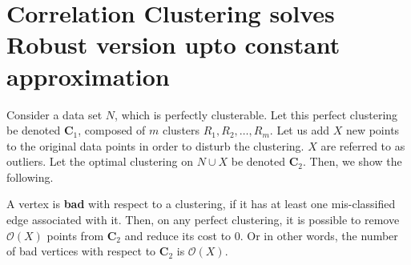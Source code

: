 \section{Correlation Clustering solves Robust version upto constant approximation}

Consider a data set $N$, which is perfectly clusterable. Let this perfect clustering be denoted $\mathbf{C}_1$, composed of $m$ clusters $R_1, R_2, \dots, R_m$. Let us add $X$ new points to the original data points in order to disturb the clustering. $X$ are referred to as outliers. Let the optimal clustering on $N \cup X$ be denoted $\mathbf{C}_2$. Then, we show the following.

\begin{theorem} \label{theorem:17}
A vertex is \textbf{bad} with respect to a clustering, if it has at least one mis-classified edge associated with it. Then, on any perfect clustering, it is possible to remove $\mathcal{O} (X)$ points from $\mathbf{C}_2$ and reduce its cost to $0$. Or in other words, the number of bad vertices with respect to $\mathbf{C}_2$ is $\mathcal{O} (X)$.
\end{theorem}
